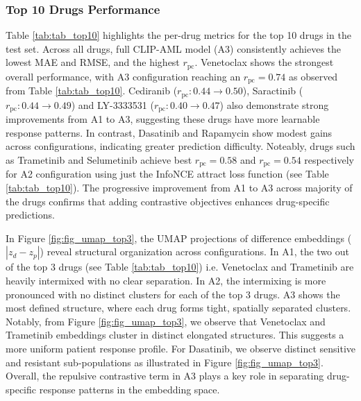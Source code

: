 \documentclass[sigconf,authordraft]{acmart}
\begin{document}
\subsubsection{Top 10 Drugs Performance}
Table \ref{tab:tab_top10} highlights the per-drug metrics for the top 10 drugs in the test set. Across all drugs, full CLIP-AML model (A3) consistently achieves the lowest MAE and RMSE, and the highest $r_{\text{pc}}$. Venetoclax shows the strongest overall performance, with A3 configuration reaching an $r_{\text{pc}}=0.74$ as observed from Table \ref{tab:tab_top10}. Cediranib ($r_{\text{pc}}: 0.44 \rightarrow 0.50$), Saractinib ($r_{\text{pc}}: 0.44 \rightarrow 0.49$) and LY-3333531 ($r_{\text{pc}}: 0.40 \rightarrow 0.47$) also demonstrate strong improvements from A1 to A3, suggesting these drugs have more learnable response patterns. In contrast, Dasatinib and Rapamycin show modest gains across configurations, indicating greater prediction difficulty. Noteably, drugs such as Trametinib and Selumetinib achieve best $r_{\text{pc}}=0.58$ and $r_{\text{pc}}=0.54$ respectively for A2 configuration using just the InfoNCE attract loss function (see Table \ref{tab:tab_top10}). The progressive improvement from A1 to A3 across majority of the drugs confirms that adding contrastive objectives enhances drug-specific predictions.

In Figure \ref{fig:fig_umap_top3}, the UMAP projections of difference embeddings ($|z_{d} - z_{p}|$) reveal structural organization across configurations. In A1, the two out of the top 3 drugs (see Table \ref{tab:tab_top10}) i.e. Venetoclax and Trametinib are heavily intermixed with no clear separation. In A2, the intermixing is more pronounced with no distinct clusters for each of the top 3 drugs. A3 shows the most defined structure, where each drug forms tight, spatially separated clusters. Notably, from Figure \ref{fig:fig_umap_top3}, we observe that Venetoclax and Trametinib embeddings cluster in distinct elongated structures. This suggests a more uniform patient response profile. For Dasatinib, we observe distinct sensitive and resistant sub-populations as illustrated in Figure \ref{fig:fig_umap_top3}. Overall, the repulsive contrastive term in A3 plays a key role in separating drug-specific response patterns in the embedding space.
\vspace{-3mm}
\end{document}
